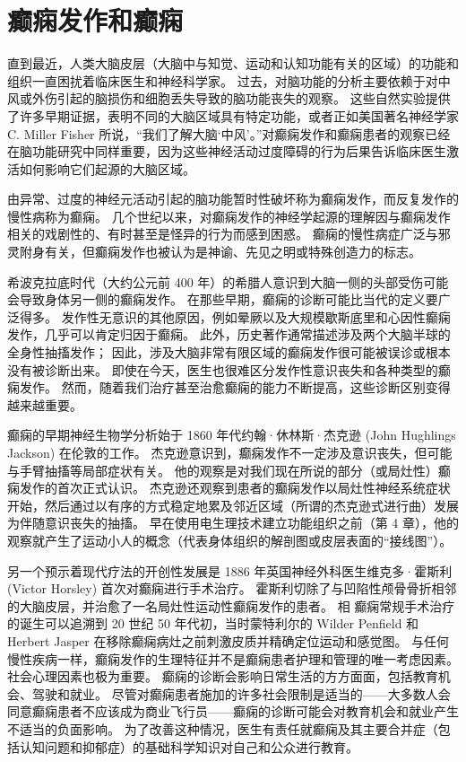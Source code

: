 \chapter{癫痫发作和癫痫}
直到最近，人类大脑皮层（大脑中与知觉、运动和认知功能有关的区域）的功能和组织一直困扰着临床医生和神经科学家。 过去，对脑功能的分析主要依赖于对中风或外伤引起的脑损伤和细胞丢失导致的脑功能丧失的观察。 这些自然实验提供了许多早期证据，表明不同的大脑区域具有特定功能，或者正如美国著名神经学家 C. Miller Fisher 所说，“我们了解大脑‘中风’。”对癫痫发作和癫痫患者的观察已经 在脑功能研究中同样重要，因为这些神经活动过度障碍的行为后果告诉临床医生激活如何影响它们起源的大脑区域。

由异常、过度的神经元活动引起的脑功能暂时性破坏称为癫痫发作，而反复发作的慢性病称为癫痫。 几个世纪以来，对癫痫发作的神经学起源的理解因与癫痫发作相关的戏剧性的、有时甚至是怪异的行为而感到困惑。 癫痫的慢性病症广泛与邪灵附身有关，但癫痫发作也被认为是神谕、先见之明或特殊创造力的标志。

希波克拉底时代（大约公元前 400 年）的希腊人意识到大脑一侧的头部受伤可能会导致身体另一侧的癫痫发作。 在那些早期，癫痫的诊断可能比当代的定义要广泛得多。 发作性无意识的其他原因，例如晕厥以及大规模歇斯底里和心因性癫痫发作，几乎可以肯定归因于癫痫。 此外，历史著作通常描述涉及两个大脑半球的全身性抽搐发作； 因此，涉及大脑非常有限区域的癫痫发作很可能被误诊或根本没有被诊断出来。 即使在今天，医生也很难区分发作性意识丧失和各种类型的癫痫发作。 然而，随着我们治疗甚至治愈癫痫的能力不断提高，这些诊断区别变得越来越重要。

癫痫的早期神经生物学分析始于 1860 年代约翰·休林斯·杰克逊 (John Hughlings Jackson) 在伦敦的工作。 杰克逊意识到，癫痫发作不一定涉及意识丧失，但可能与手臂抽搐等局部症状有关。 他的观察是对我们现在所说的部分（或局灶性）癫痫发作的首次正式认识。 杰克逊还观察到患者的癫痫发作以局灶性神经系统症状开始，然后通过以有序的方式稳定地累及邻近区域（所谓的杰克逊式进行曲）发展为伴随意识丧失的抽搐。 早在使用电生理技术建立功能组织之前（第 4 章），他的观察就产生了运动小人的概念（代表身体组织的解剖图或皮层表面的“接线图”）。

另一个预示着现代疗法的开创性发展是 1886 年英国神经外科医生维克多·霍斯利 (Victor Horsley) 首次对癫痫进行手术治疗。 霍斯利切除了与凹陷性颅骨骨折相邻的大脑皮层，并治愈了一名局灶性运动性癫痫发作的患者。 相 癫痫常规手术治疗的诞生可以追溯到 20 世纪 50 年代初，当时蒙特利尔的 Wilder Penfield 和 Herbert Jasper 在移除癫痫病灶之前刺激皮质并精确定位运动和感觉图。 与任何慢性疾病一样，癫痫发作的生理特征并不是癫痫患者护理和管理的唯一考虑因素。 社会心理因素也极为重要。 癫痫的诊断会影响日常生活的方方面面，包括教育机会、驾驶和就业。 尽管对癫痫患者施加的许多社会限制是适当的——大多数人会同意癫痫患者不应该成为商业飞行员——癫痫的诊断可能会对教育机会和就业产生不适当的负面影响。 为了改善这种情况，医生有责任就癫痫及其主要合并症（包括认知问题和抑郁症）的基础科学知识对自己和公众进行教育。

